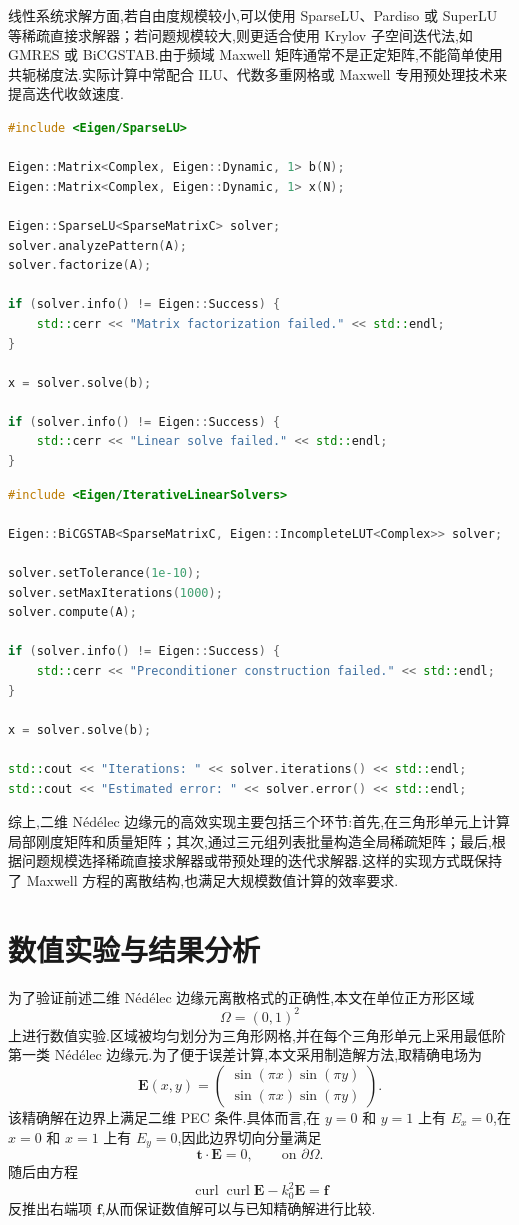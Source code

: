 \documentclass[12pt,hyperref,a4paper,UTF8,twoside]{ctexart}
\newcommand{\curl}{\operatorname{curl}}
\newcommand{\E}{\bm{E}}
\newcommand{\tvec}{\bm{t}}
\begin{document}
线性系统求解方面,若自由度规模较小,可以使用 SparseLU、Pardiso 或 SuperLU 等稀疏直接求解器；若问题规模较大,则更适合使用 Krylov 子空间迭代法,如 GMRES 或 BiCGSTAB.由于频域 Maxwell 矩阵通常不是正定矩阵,不能简单使用共轭梯度法.实际计算中常配合 ILU、代数多重网格或 Maxwell 专用预处理技术来提高迭代收敛速度.

\begin{lstlisting}[language=C++, caption={基于 Eigen 的稀疏直接求解示例}]
#include <Eigen/SparseLU>

Eigen::Matrix<Complex, Eigen::Dynamic, 1> b(N);
Eigen::Matrix<Complex, Eigen::Dynamic, 1> x(N);

Eigen::SparseLU<SparseMatrixC> solver;
solver.analyzePattern(A);
solver.factorize(A);

if (solver.info() != Eigen::Success) {
    std::cerr << "Matrix factorization failed." << std::endl;
}

x = solver.solve(b);

if (solver.info() != Eigen::Success) {
    std::cerr << "Linear solve failed." << std::endl;
}
\end{lstlisting}

\begin{lstlisting}[language=C++, caption={基于 BiCGSTAB 的迭代求解示例}]
#include <Eigen/IterativeLinearSolvers>

Eigen::BiCGSTAB<SparseMatrixC, Eigen::IncompleteLUT<Complex>> solver;

solver.setTolerance(1e-10);
solver.setMaxIterations(1000);
solver.compute(A);

if (solver.info() != Eigen::Success) {
    std::cerr << "Preconditioner construction failed." << std::endl;
}

x = solver.solve(b);

std::cout << "Iterations: " << solver.iterations() << std::endl;
std::cout << "Estimated error: " << solver.error() << std::endl;
\end{lstlisting}

综上,二维 Nédélec 边缘元的高效实现主要包括三个环节:首先,在三角形单元上计算局部刚度矩阵和质量矩阵；其次,通过三元组列表批量构造全局稀疏矩阵；最后,根据问题规模选择稀疏直接求解器或带预处理的迭代求解器.这样的实现方式既保持了 Maxwell 方程的离散结构,也满足大规模数值计算的效率要求.


\section{数值实验与结果分析}

为了验证前述二维 Nédélec 边缘元离散格式的正确性,本文在单位正方形区域
\[
\Omega=(0,1)^2
\]
上进行数值实验.区域被均匀划分为三角形网格,并在每个三角形单元上采用最低阶第一类 Nédélec 边缘元.为了便于误差计算,本文采用制造解方法,取精确电场为
\[
\E(x,y)
=
\begin{pmatrix}
\sin(\pi x)\sin(\pi y)\\
\sin(\pi x)\sin(\pi y)
\end{pmatrix}.
\]
该精确解在边界上满足二维 PEC 条件.具体而言,在 $y=0$ 和 $y=1$ 上有 $E_x=0$,在 $x=0$ 和 $x=1$ 上有 $E_y=0$,因此边界切向分量满足
\[
\tvec\cdot\E=0,
\qquad \text{on } \partial\Omega.
\]
随后由方程
\[
\curl\curl\E-k_0^2\E=\bm{f}
\]
反推出右端项 $\bm{f}$,从而保证数值解可以与已知精确解进行比较.
\end{document}
